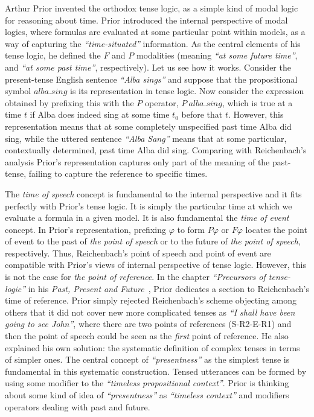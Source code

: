 Arthur Prior invented the orthodox tense logic, as a simple kind of modal
logic for reasoning about time. Prior introduced the internal perspective of
modal logics, where formulas are evaluated at some particular point within
models, as a way of capturing the \emph{``time-situated''} information. As the central
elements of his tense logic, he defined the $F$ and $P$ modalities (meaning 
\emph{``at some future time''}, and 
\emph{``at some past time''}, respectively). Let
us see how it works. Consider the present-tense English sentence 
\emph{``Alba sings''} and suppose that the
propositional symbol $\mathit{alba.sing}$ is its representation in tense logic. Now
consider the expression obtained by prefixing this with the $P$ operator, $%
P\ \mathit{alba.sing}$, which is true at a time $t$ if Alba does indeed sing at some
time $t_{0}$ before that $t$. However, this representation means that at
some completely unspecified past time Alba did sing, while the uttered
sentence \emph{``Alba Sang''} means that at some particular, contextually
determined, past time Alba did sing. Comparing with Reichenbach's analysis
Prior's representation captures only part of the meaning of the past-tense,
failing to capture the reference to specific times.

The \emph{time of speech} concept is fundamental to the internal
perspective and it fits perfectly with Prior's tense logic. It is simply the
particular time at which we evaluate a formula in a given model. It is also
fundamental the \emph{time of event} concept. In Prior's representation,
prefixing $\varphi $ to form $P\varphi $ or $F\varphi $ locates the point of
event to the past of \emph{the point of speech} or to the future of 
\emph{the point of speech}, respectively. Thus, Reichenbach's point of
speech and point of event are compatible with Prior's views of internal
perspective of tense logic. However, this is not the case for \emph{the
point of reference}. In the chapter 
\emph{``Precursors of tense-logic''} in his \emph{Past, Present and
Future}~\cite{Prior1967}, Prior dedicates a section to
Reichenbach's time of reference. Prior simply rejected Reichenbach's scheme
objecting among others that it did not cover new more complicated tenses as 
\emph{``I shall have been going to see John''},  where there are two points of references
(S-R2-E-R1) and then the point of speech could be seen as the 
\emph{first} point of reference. He also
explained his own solution: the systematic definition of complex tenses in
terms of simpler ones. The central concept of 
\emph{``presentness''} as the simplest tense is fundamental in this
systematic construction. Tensed utterances can be formed by using some
modifier to the \emph{``timeless propositional
context''}. Prior is thinking about some kind of idea of
\emph{``presentness''} as 
\emph{``timeless context''} and modifiers
operators dealing with past and future.

